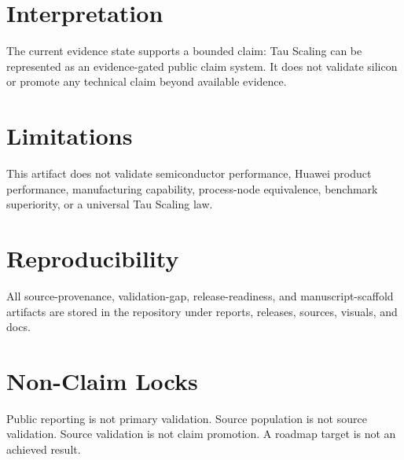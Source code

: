 \documentclass[11pt]{article}
\begin{document}
\section{Interpretation}
The current evidence state supports a bounded claim: Tau Scaling can be represented as an evidence-gated public claim system. It does not validate silicon or promote any technical claim beyond available evidence.

\section{Limitations}
This artifact does not validate semiconductor performance, Huawei product performance, manufacturing capability, process-node equivalence, benchmark superiority, or a universal Tau Scaling law.

\section{Reproducibility}
All source-provenance, validation-gap, release-readiness, and manuscript-scaffold artifacts are stored in the repository under reports, releases, sources, visuals, and docs.

\section{Non-Claim Locks}
Public reporting is not primary validation. Source population is not source validation. Source validation is not claim promotion. A roadmap target is not an achieved result.
\end{document}
